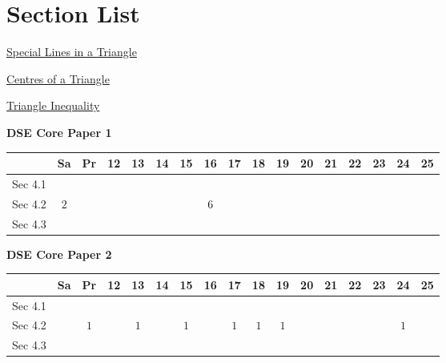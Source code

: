 \documentclass[12pt, a4paper]{article}
\begin{document}
\section*{Section List}
\begin{enumx}[label=Sec 4.\arabic*\ ]
\item \hyperref[section:3-4-1]{Special Lines in a Triangle}
\item \hyperref[section:3-4-2]{Centres of a Triangle \NF}
\item \hyperref[section:3-4-3]{Triangle Inequality \NF}
\end{enumx}
\begin{absolutelynopagebreak}
\begin{center}
\textbf{DSE Core Paper 1}
\end{center}
\begin{center}
\begin{tabular}{|l|c|c|c|c|c|c|c|c|c|c|c|c|c|c|c|c|}
\hline
        & Sa & Pr & 12 & 13 & 14 & 15 & 16 & 17 & 18 & 19 & 20 & 21 & 22 & 23 & 24 & 25 \\\hline\hline
Sec 4.1 &  &  &  &  &  &  &  &  &  &  &  &  &  &  &  &  \\\hline
Sec 4.2 &  $2$ &  &  &  &  &  &  $6$ &  &  &  &  &  &  &  &  &  \\\hline
Sec 4.3 &  &  &  &  &  &  &  &  &  &  &  &  &  &  &  &  \\\hline
\end{tabular}
\end{center}
\end{absolutelynopagebreak}
\begin{absolutelynopagebreak}
\begin{center}
\textbf{DSE Core Paper 2}
\end{center}
\begin{center}
\begin{tabular}{|l|c|c|c|c|c|c|c|c|c|c|c|c|c|c|c|c|}
\hline
        & Sa & Pr & 12 & 13 & 14 & 15 & 16 & 17 & 18 & 19 & 20 & 21 & 22 & 23 & 24 & 25 \\\hline\hline
Sec 4.1 &  &  &  &  &  &  &  &  &  &  &  &  &  &  &  &  \\\hline
Sec 4.2 &  &  $1$ &  &  $1$ &  &  $1$ &  &  $1$ &  $1$ &  $1$ &  &  &  &  &  $1$ &  \\\hline
Sec 4.3 &  &  &  &  &  &  &  &  &  &  &  &  &  &  &  &  \\\hline
\end{tabular}
\end{center}
\end{absolutelynopagebreak}
\end{document}
